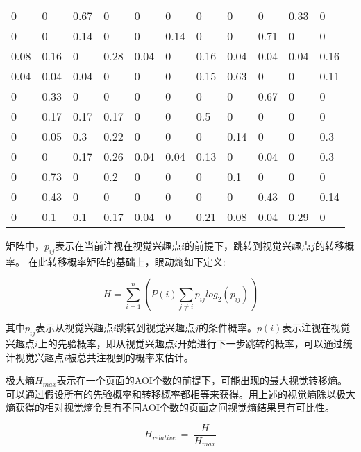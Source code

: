 \begin{table}[H]
\centering
  \begin{tabular}{@{}lllllllllll@{}}
  \hline
  0    & 0    & 0.67 & 0    & 0    & 0    & 0    & 0    & 0    & 0.33 & 0    \\
  0    & 0    & 0.14 & 0    & 0    & 0.14 & 0    & 0    & 0.71 & 0    & 0    \\
  0.08 & 0.16 & 0    & 0.28 & 0.04 & 0    & 0.16 & 0.04 & 0.04 & 0.04 & 0.16 \\
  0.04 & 0.04 & 0.04 & 0    & 0    & 0    & 0.15 & 0.63 & 0    & 0    & 0.11 \\
  0    & 0.33 & 0    & 0    & 0    & 0    & 0    & 0    & 0.67 & 0    & 0    \\
  0    & 0.17 & 0.17 & 0.17 & 0    & 0    & 0.5  & 0    & 0    & 0    & 0    \\
  0    & 0.05 & 0.3  & 0.22 & 0    & 0    & 0    & 0.14 & 0    & 0    & 0.3  \\
  0    & 0    & 0.17 & 0.26 & 0.04 & 0.04 & 0.13 & 0    & 0.04 & 0    & 0.3  \\
  0    & 0.73 & 0    & 0.2  & 0    & 0    & 0    & 0.1  & 0    & 0    & 0    \\
  0    & 0.43 & 0    & 0    & 0    & 0    & 0    & 0    & 0.43 & 0    & 0.14 \\
  0    & 0.1  & 0.1  & 0.17 & 0.04 & 0    & 0.21 & 0.08 & 0.04 & 0.29 & 0\\
  \hline
  \end{tabular}
\end{table}

矩阵中，$p_{ij}$表示在当前注视在视觉兴趣点$i$的前提下，跳转到视觉兴趣点$j$的转移概率。
在此转移概率矩阵的基础上，眼动熵如下定义:

$$H = \sum_{i=1}^n(P(i)\sum_{j\neq i} p_{ij}log_2(p_{ij}))$$

其中$p_{ij}$表示从视觉兴趣点$i$跳转到视觉兴趣点$j$的条件概率。$p(i)$表示注视在视觉兴趣点$i$上的先验概率，即从视觉兴趣点$i$开始进行下一步跳转的概率，可以通过统计视觉兴趣点$i$被总共注视到的概率来估计。

极大熵$H_{max}$表示在一个页面的AOI个数的前提下，可能出现的最大视觉转移熵。可以通过假设所有的先验概率和转移概率都相等来获得。用上述的视觉熵除以极大熵获得的相对视觉熵令具有不同AOI个数的页面之间视觉熵结果具有可比性。

$$H_{relative}~=~\frac{H}{H_{max}}$$

